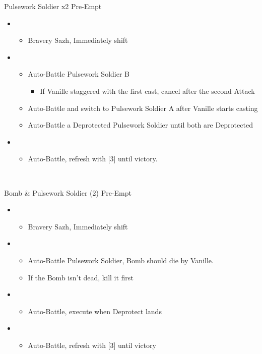 	\begin{battle}[0:24]{Pulsework Soldier x2 Pre-Empt}
		\begin{itemize}
			\item \second
			      \begin{itemize}
				      \item Bravery Sazh, Immediately shift
			      \end{itemize}
			\item \third
			      \begin{itemize}
				      \item Auto-Battle Pulsework Soldier B
				            \begin{itemize}
					            \item If Vanille staggered with the first cast, cancel after the second Attack
				            \end{itemize}
				      \item Auto-Battle and switch to Pulsework Soldier A after Vanille starts casting
				      \item Auto-Battle a Deprotected Pulsework Soldier until both are Deprotected
			      \end{itemize}
			\item \first
			      \begin{itemize}
				      \item Auto-Battle, refresh with [3] until victory.
			      \end{itemize}
		\end{itemize}
	\end{battle}
	\vfill
	\ 
	\begin{battle}[0:21]{Bomb \& Pulsework Soldier (2) Pre-Empt}
		\begin{itemize}
			\item \second
			      \begin{itemize}
				      \item Bravery Sazh, Immediately shift
			      \end{itemize}
			\item \first
			      \begin{itemize}
				      \item Auto-Battle Pulsework Soldier, Bomb should die by Vanille.
				      \item If the Bomb isn't dead, kill it first
			      \end{itemize}
			\item \third
			      \begin{itemize}
				      \item Auto-Battle, execute when Deprotect lands
			      \end{itemize}
			\item \first
			      \begin{itemize}
				      \item Auto-Battle, refresh with [3] until victory
			      \end{itemize}
		\end{itemize}
	\end{battle}


